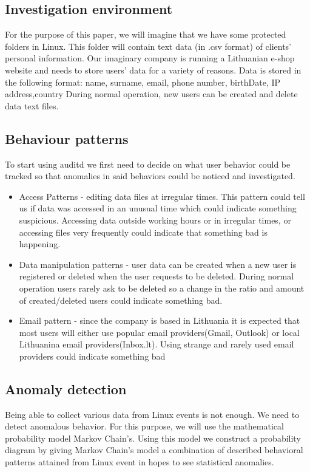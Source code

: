 \documentclass{VUMIFPSmagistrinis}
\begin{document}
    \subsection{Investigation environment}
        For the purpose of this paper, we will imagine that we have some protected folders in Linux.
        This folder will contain text data (in .csv format) of clients' personal information.
        Our imaginary company is running a Lithuanian e-shop website and needs to store users' data for a variety of reasons.
        Data is stored in the following format: name, surname, email, phone number, birthDate, IP address,country
        During normal operation, new users can be created and delete data text files.
    \subsection{Behaviour patterns}
        To start using auditd we first need to decide on what user behavior could be tracked so that anomalies in said behaviors could be noticed and investigated.

        \begin{itemize}
            \item Access Patterns - editing data files at irregular times. This pattern could tell us if data was accessed in an unusual time which could indicate something suspicious. Accessing data outside working hours or in irregular times, or accessing files very frequently could indicate that something bad is happening.
            \item Data manipulation patterns - user data can be created when a new user is registered or deleted when the user requests to be deleted. 
            During normal operation users rarely ask to be deleted so a change in the ratio and amount of created/deleted users could indicate something bad.
            \item Email pattern - since the company is based in Lithuania it is expected that most users will either use popular email providers(Gmail, Outlook) or local Lithuanina email providers(Inbox.lt).
            Using strange and rarely used email providers could indicate something bad
        \end{itemize}

    \subsection{Anomaly detection}
        Being able to collect various data from Linux events is not enough.
        We need to detect anomalous behavior. 
        For this purpose, we will use the mathematical probability model Markov Chain's.
        Using this model we construct a probability diagram by giving Markov Chain's model a combination of described behavioral patterns attained from Linux event in hopes to see statistical anomalies.
\end{document}
